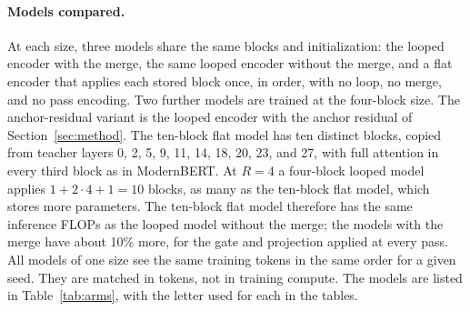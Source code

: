 \documentclass[11pt]{article}
\begin{document}
\paragraph{Models compared.}
At each size, three models share the same blocks and initialization: the looped encoder with the merge, the same looped encoder without the merge,
and a flat encoder that applies each stored block once, in order, with no loop, no merge, and no pass encoding. Two further models are
trained at the four-block size. The anchor-residual variant is the looped encoder with the anchor residual of Section~\ref{sec:method}. The
ten-block flat model has ten distinct blocks, copied from teacher layers 0, 2, 5, 9, 11, 14, 18, 20, 23, and 27, with full attention in every
third block as in ModernBERT. At $R = 4$ a four-block looped model applies $1 + 2\cdot 4 + 1 = 10$ blocks, as many as the ten-block flat model,
which stores more parameters. The ten-block flat model therefore has the same inference FLOPs as the looped model without the merge; the models with
the merge have about 10\% more, for the gate and projection applied at every pass. All models of
one size see the same training tokens in the same order for a given seed. They are matched in tokens, not in training compute.
The models are listed in Table~\ref{tab:arms}, with the letter used for each in the tables.
\end{document}
